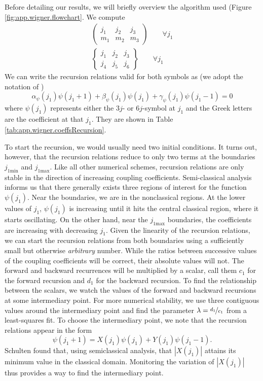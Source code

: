 Before detailing our results, we will briefly overview
the algorithm used (\see Figure \ref{fig:app.wigner.flowchart}. We compute
  \begin{align*}
    \begin{pmatrix}j_1 & j_2 & j_3 \\ m_1 & m_2 & m_3 \end{pmatrix} \qquad \forall j_1 \\
    \begin{Bmatrix}j_1 & j_2 & j_3 \\ j_4 & j_5 & j_6 \end{Bmatrix} \qquad \forall j_1
  \end{align*}
We can write the recursion relations valid for both symbols as 
(we adopt the notation of \cite{LUS1998})
  \begin{equation}
    \alpha_\psi(j_1)\psi(j_1+1)+\beta_\psi(j_1)\psi(j_1)+\gamma_\psi(j_1)\psi(j_1-1)=0
  \end{equation}
where $\psi(j_1)$ represents either the $3j$- or $6j$-symbol at $j_1$
and the Greek letters are the coefficient at that $j_1$. They are
shown in Table \ref{tab:app.wigner.coeffsRecursion}. 

To start the recursion, we would usually need two initial
conditions. It turns out, however, that the recursion
relations reduce to only two terms at the boundaries
$j_{1\text{min}}$ and $j_{1\text{max}}$. Like all
other numerical schemes, recursion relations
are only stable in the direction of increasing
coupling coefficients. Semi-classical analysis
\cite{SCH1975} informs us that there generally exists
three regions of interest for the function $\psi(j_1)$.
Near the boundaries, we are in the nonclassical 
regions. At the lower values of $j_1$, $\psi(j_1)$
is increasing until it hits the central classical
region, where it starts oscillating. On the other
hand, near the $j_{1\text{max}}$ boundaries, the
coefficients are increasing with decreasing $j_1$. 
Given the linearity of the recursion relations, we
can start the recursion relations from both boundaries
using a sufficiently small but otherwise \textit{arbitrary} number. 
While the ratios between successive values of the coupling coefficients
will be correct, their absolute values will not. The forward and backward
recurrences will be multiplied by a scalar, call them $c_1$ for the forward
recursion and $d_1$ for the backward recursion. To find the relationship
between the scalars, we watch the values of the forward and backward
recursions at some intermediary point. For more numerical stability, 
we use three contiguous values around the intermediary point
and find the parameter $\lambda=\nicefrac{d_1}{c_1}$ from a least-squares fit.
To choose the intermediary point, we note that the recursion relations
appear in the form
  \begin{equation}
   \psi(j_1+1)=X(j_1)\psi(j_1)+Y(j_1)\psi(j_1-1).
  \end{equation}
Schulten found that, using semiclassical analysis, 
that $|X(j_1)|$ attains its minimum value 
in the classical domain. Monitoring the variation
of $|X(j_1)|$ thus provides a way to find the intermediary point.

